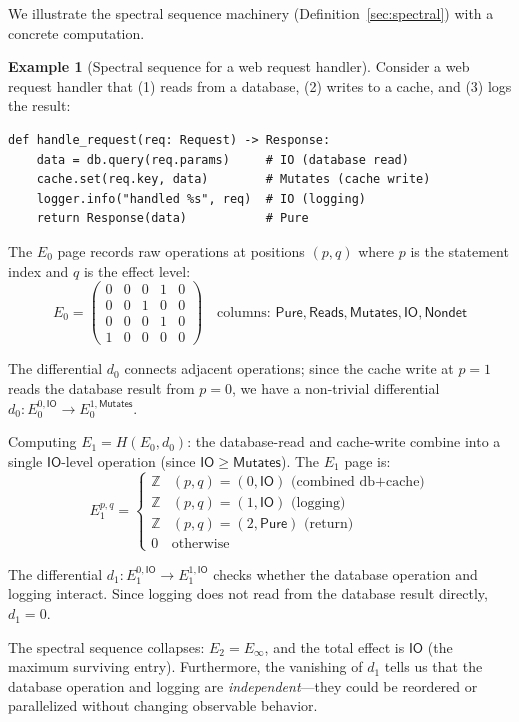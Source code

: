 \documentclass[11pt,a4paper]{report}
\theoremstyle{definition}
\newtheorem{example}[definition]{Example}
\theoremstyle{plain}
\newcommand{\Pure}{\mathsf{Pure}}
\newcommand{\Reads}{\mathsf{Reads}}
\newcommand{\Mutates}{\mathsf{Mutates}}
\newcommand{\IO}{\mathsf{IO}}
\newcommand{\Nondet}{\mathsf{Nondet}}
\begin{document}
We illustrate the spectral sequence machinery (Definition~\ref{sec:spectral})
with a concrete computation.

\begin{example}[Spectral sequence for a web request handler]
\label{ex:spectral-concrete}
Consider a web request handler that (1) reads from a database, (2) writes to
a cache, and (3) logs the result:
\begin{lstlisting}[style=python]
def handle_request(req: Request) -> Response:
    data = db.query(req.params)     # IO (database read)
    cache.set(req.key, data)        # Mutates (cache write)
    logger.info("handled %s", req)  # IO (logging)
    return Response(data)           # Pure
\end{lstlisting}

The $E_0$ page records raw operations at positions $(p, q)$ where $p$ is the
statement index and $q$ is the effect level:
\[
  E_0 = \begin{pmatrix}
    0 & 0 & 0 & 1 & 0 \\
    0 & 0 & 1 & 0 & 0 \\
    0 & 0 & 0 & 1 & 0 \\
    1 & 0 & 0 & 0 & 0
  \end{pmatrix}
  \quad
  \text{columns: } \Pure, \Reads, \Mutates, \IO, \Nondet
\]

The differential $d_0$ connects adjacent operations; since the cache write at
$p=1$ reads the database result from $p=0$, we have a non-trivial differential
$d_0 : E_0^{0,\IO} \to E_0^{1,\Mutates}$.

Computing $E_1 = H(E_0, d_0)$: the database-read and cache-write combine into a
single $\IO$-level operation (since $\IO \geq \Mutates$).  The $E_1$ page is:
\[
  E_1^{p,q} = \begin{cases}
    \mathbb{Z} & (p, q) = (0, \IO) \text{ (combined db+cache)} \\
    \mathbb{Z} & (p, q) = (1, \IO) \text{ (logging)} \\
    \mathbb{Z} & (p, q) = (2, \Pure) \text{ (return)} \\
    0 & \text{otherwise}
  \end{cases}
\]

The differential $d_1 : E_1^{0,\IO} \to E_1^{1,\IO}$ checks whether the
database operation and logging interact.  Since logging does not read from the
database result directly, $d_1 = 0$.

The spectral sequence collapses: $E_2 = E_\infty$, and the total effect is
$\IO$ (the maximum surviving entry).  Furthermore, the vanishing of $d_1$
tells us that the database operation and logging are \emph{independent}---they
could be reordered or parallelized without changing observable behavior.
\end{example}
\end{document}
